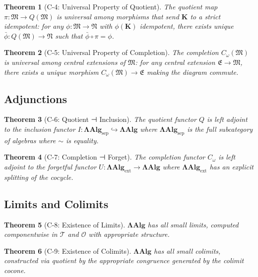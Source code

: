 \documentclass[12pt, oneside]{article}
\newtheorem{theorem}{Theorem}[section]
\newcommand{\K}{\mathbf{K}}
\newcommand{\T}{\mathcal{T}}
\newcommand{\Opr}{\mathcal{O}}
\newcommand{\mf}[1]{\mathfrak{#1}}
\begin{document}
\begin{theorem}[C-4: Universal Property of Quotient]
The quotient map $\pi: \mf{M} \rightarrow Q(\mf{M})$ is universal among morphisms that send $\K$ to a strict idempotent: for any $\phi: \mf{M} \rightarrow \mf{N}$ with $\phi(\K)$ idempotent, there exists unique $\bar{\phi}: Q(\mf{M}) \rightarrow \mf{N}$ such that $\bar{\phi} \circ \pi = \phi$.
\end{theorem}

\begin{theorem}[C-5: Universal Property of Completion]
The completion $C_\omega(\mf{M})$ is universal among central extensions of $\mf{M}$: for any central extension $\mf{E} \rightarrow \mf{M}$, there exists a unique morphism $C_\omega(\mf{M}) \rightarrow \mf{E}$ making the diagram commute.
\end{theorem}

\subsection{Adjunctions}

\begin{theorem}[C-6: Quotient ⊣ Inclusion]
The quotient functor $Q$ is left adjoint to the inclusion functor $I: \mathbf{ΛAlg}_{\text{sep}} \hookrightarrow \mathbf{ΛAlg}$ where $\mathbf{ΛAlg}_{\text{sep}}$ is the full subcategory of algebras where $\sim$ is equality.
\end{theorem}

\begin{theorem}[C-7: Completion ⊣ Forget]
The completion functor $C_\omega$ is left adjoint to the forgetful functor $U: \mathbf{ΛAlg}_{\text{ext}} \rightarrow \mathbf{ΛAlg}$ where $\mathbf{ΛAlg}_{\text{ext}}$ has an explicit splitting of the cocycle.
\end{theorem}

\subsection{Limits and Colimits}

\begin{theorem}[C-8: Existence of Limits]
$\mathbf{ΛAlg}$ has all small limits, computed componentwise in $\T$ and $\Opr$ with appropriate structure.
\end{theorem}

\begin{theorem}[C-9: Existence of Colimits]
$\mathbf{ΛAlg}$ has all small colimits, constructed via quotient by the appropriate congruence generated by the colimit cocone.
\end{theorem}
\end{document}
